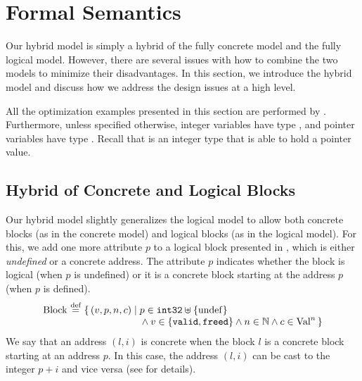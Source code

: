 \section{Formal Semantics}
\label{sec:intptrcast:formal-semantics}

Our hybrid model is simply a hybrid of the fully concrete
model and the fully logical model. However, there are several issues
with how to combine the two models to minimize their disadvantages.
In this section, we introduce the hybrid model and discuss how
we address the design issues at a high level.  %

All the optimization examples presented in this section are performed by .
Furthermore, unless specified otherwise, integer variables have type , and pointer
variables have type .  Recall that  is an integer type that is able to
hold a pointer value.


\subsection{Hybrid of Concrete and Logical Blocks}
\label{sec:intptrcast:formal-semantics:representation}

Our hybrid model slightly generalizes the logical model to allow
both concrete blocks (as in the concrete model) and logical blocks (as
in the logical model). For this, we add one more attribute $p$ to a
logical block presented in ,
which is either \emph{undefined} or a concrete address.
The attribute $p$ indicates whether the block is logical (when $p$ is
undefined) or it is a concrete block starting at the address $p$ (when
$p$ is defined).
\[
\begin{array}{@{}l@{~}c@{~}l@{}}
\mathrm{Block} &\defeq&
\setof{(v, p, n, c) \suchthat
  p \in \mathtt{int32}\uplus\setofz{\mathrm{undef}} \\
&&\qquad\qquad\quad~~
  {}\land v \in \setofz{\rtlvalid,\rtlfreed} \land n \in \Nat \land c \in \rtlVal^n }
\end{array}
\]
We say that an address $(l,i)$ is concrete when the block $l$ is a
concrete block starting at an address $p$. 
In this case, the address $(l,i)$ can be cast to the integer $p+i$
and vice versa (see  for details).


